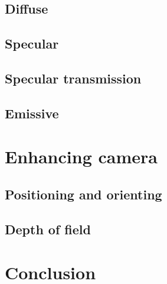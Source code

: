 \documentclass[]{article}
\begin{document}
		\subsection{Diffuse}
		\subsection{Specular}
		\subsection{Specular transmission}
		\subsection{Emissive}
	\section{Enhancing camera}
		\subsection{Positioning and orienting}
		\subsection{Depth of field}
	\section{Conclusion}
	
	\clearpage
	{}
	
		
\end{document}
